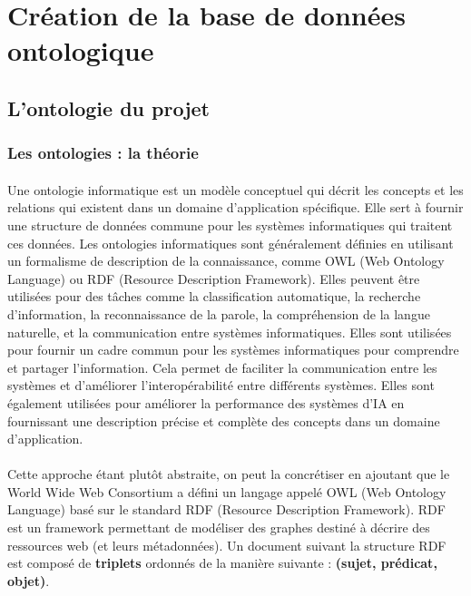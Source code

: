 \section{Création de la base de données ontologique}
\subsection{L'ontologie du projet}

\subsubsection{Les ontologies : la théorie}
\paragraph{} \hspace{10mm}
Une ontologie informatique est un modèle conceptuel qui décrit les concepts et les relations qui existent dans un domaine d'application spécifique. Elle sert à fournir une structure de données commune pour les systèmes informatiques qui traitent ces données. Les ontologies informatiques sont généralement définies en utilisant un formalisme de description de la connaissance, comme OWL (Web Ontology Language) ou RDF (Resource Description Framework). Elles peuvent être utilisées pour des tâches comme la classification automatique, la recherche d'information, la reconnaissance de la parole, la compréhension de la langue naturelle, et la communication entre systèmes informatiques.
Elles sont utilisées pour fournir un cadre commun pour les systèmes informatiques pour comprendre et partager l'information. Cela permet de faciliter la communication entre les systèmes et d'améliorer l'interopérabilité entre différents systèmes. Elles sont également utilisées pour améliorer la performance des systèmes d'IA en fournissant une description précise et complète des concepts dans un domaine d'application.

\paragraph{} \hspace{10mm}
Cette approche étant plutôt abstraite, on peut la concrétiser en ajoutant que le World Wide Web Consortium a défini un langage appelé OWL (Web Ontology Language) basé sur le standard RDF (Resource Description Framework). RDF est un framework permettant de modéliser des graphes destiné à décrire des ressources web (et leurs métadonnées). Un document suivant la structure RDF est composé de \textbf{triplets} ordonnés de la manière suivante : \textbf{(sujet, prédicat, objet)}.

